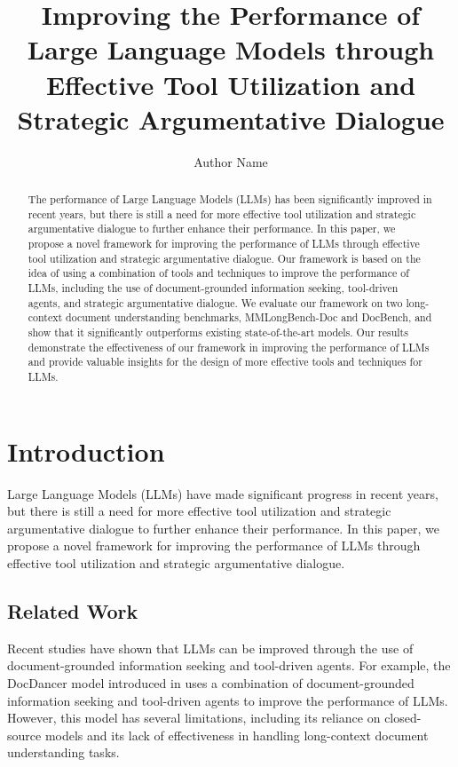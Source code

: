 \documentclass[12pt, a4paper]{article}
\begin{document}
\title{Improving the Performance of Large Language Models through Effective Tool Utilization and Strategic Argumentative Dialogue}

\author{Author Name}

\maketitle

\begin{abstract}
The performance of Large Language Models (LLMs) has been significantly improved in recent years, but there is still a need for more effective tool utilization and strategic argumentative dialogue to further enhance their performance. In this paper, we propose a novel framework for improving the performance of LLMs through effective tool utilization and strategic argumentative dialogue. Our framework is based on the idea of using a combination of tools and techniques to improve the performance of LLMs, including the use of document-grounded information seeking, tool-driven agents, and strategic argumentative dialogue. We evaluate our framework on two long-context document understanding benchmarks, MMLongBench-Doc and DocBench, and show that it significantly outperforms existing state-of-the-art models. Our results demonstrate the effectiveness of our framework in improving the performance of LLMs and provide valuable insights for the design of more effective tools and techniques for LLMs.
\end{abstract}

\section{Introduction}
Large Language Models (LLMs) have made significant progress in recent years, but there is still a need for more effective tool utilization and strategic argumentative dialogue to further enhance their performance. In this paper, we propose a novel framework for improving the performance of LLMs through effective tool utilization and strategic argumentative dialogue.

\subsection{Related Work}
Recent studies have shown that LLMs can be improved through the use of document-grounded information seeking and tool-driven agents. For example, the DocDancer model introduced in \cite{zhang2026docdanceragenticdocumentgroundedinformation} uses a combination of document-grounded information seeking and tool-driven agents to improve the performance of LLMs. However, this model has several limitations, including its reliance on closed-source models and its lack of effectiveness in handling long-context document understanding tasks.
\end{document}
